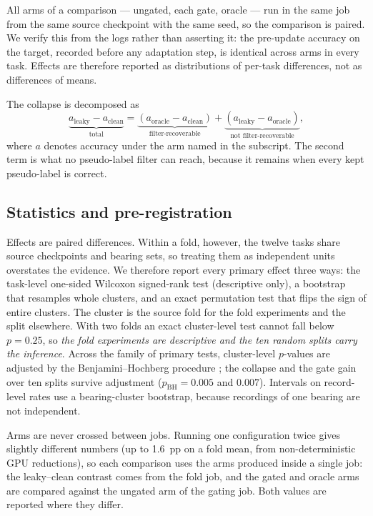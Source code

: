 All arms of a comparison --- ungated, each gate, oracle --- run in the same job from the same source checkpoint with the
same seed, so the comparison is paired. We verify this from the logs rather than asserting it: the pre-update accuracy on
the target, recorded before any adaptation step, is identical across arms in every task. Effects are therefore reported as
distributions of per-task differences, not as differences of means.

The collapse is decomposed as
\begin{equation}
\underbrace{a_{\mathrm{leaky}}-a_{\mathrm{clean}}}_{\text{total}}
=\underbrace{\left(a_{\mathrm{oracle}}-a_{\mathrm{clean}}\right)}_{\text{filter-recoverable}}
+\underbrace{\left(a_{\mathrm{leaky}}-a_{\mathrm{oracle}}\right)}_{\text{not filter-recoverable}},
\label{eq:decomp}
\end{equation}
where $a$ denotes accuracy under the arm named in the subscript. The second term is what no pseudo-label filter can reach,
because it remains when every kept pseudo-label is correct.

\subsection{Statistics and pre-registration}

Effects are paired differences. Within a fold, however, the twelve tasks share source checkpoints and bearing sets, so
treating them as independent units overstates the evidence. We therefore report every primary effect three ways: the
task-level one-sided Wilcoxon signed-rank test (descriptive only), a bootstrap that resamples whole clusters, and an exact
permutation test that flips the sign of entire clusters. The cluster is the source fold for the fold experiments and the
split elsewhere. With two folds an exact cluster-level test cannot fall below $p = 0.25$, so \emph{the fold experiments are
descriptive and the ten random splits carry the inference}. Across the family of primary tests, cluster-level $p$-values are
adjusted by the Benjamini--Hochberg procedure \cite{benjamini2001}; the collapse and the gate gain over ten splits survive
adjustment ($p_{\mathrm{BH}} = 0.005$ and $0.007$). Intervals on record-level rates use a bearing-cluster bootstrap, because
recordings of one bearing are not independent.

Arms are never crossed between jobs. Running one configuration twice gives slightly different numbers (up to 1.6~pp on a
fold mean, from non-deterministic GPU reductions), so each comparison uses the arms produced inside a single job: the
leaky--clean contrast comes from the fold job, and the gated and oracle arms are compared against the ungated arm of the
gating job. Both values are reported where they differ.

